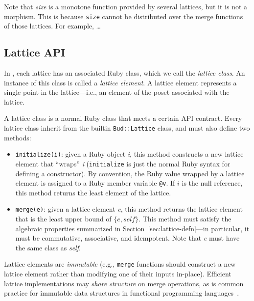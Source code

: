 Note that \emph{size} is a monotone function provided by several lattices, but
it is not a morphism. This is because \texttt{size} cannot be distributed over
the merge functions of those lattices. For example, \ldots

\subsection{Lattice API}
\label{sec:lattice-api}
In \lang, each lattice has an associated Ruby class, which we call the
\emph{lattice class}. An instance of this class is called a \emph{lattice
  element}. A lattice element represents a single point in the lattice---i.e., an
element of the poset associated with the lattice.

A lattice class is a normal Ruby class that meets a certain API contract. Every
lattice class inherit from the builtin \texttt{Bud::Lattice} class, and
must also define two methods:
\begin{itemize}
\item \texttt{initialize(i)}: given a Ruby object \emph{i}, this method
  constructs a new lattice element that ``wraps'' \emph{i} (\texttt{initialize}
  is just the normal Ruby syntax for defining a constructor). By convention, the
  Ruby value wrapped by a lattice element is assigned to a Ruby member variable
  \texttt{@v}. If $i$ is the null reference, this method returns the least
  element of the lattice.

\item \texttt{merge(e)}: given a lattice element \emph{e}, this method returns the
  lattice element that is the least upper bound of $\{e, \textit{self}\}$. This method must
  satisfy the algebraic properties summarized in Section~\ref{sec:lattice-defn}---in
  particular, it must be commutative, associative, and idempotent. Note that
  \emph{e} must have the same class as \emph{self}.
\end{itemize}
Lattice elements are \emph{immutable} (e.g., \texttt{merge} functions should
construct a new lattice element rather than modifying one of their inputs
in-place). Efficient lattice implementations may \emph{share structure} on merge
operations, as is common practice for immutable data structures in functional
programming languages~\cite{Okasaki1999}. %

